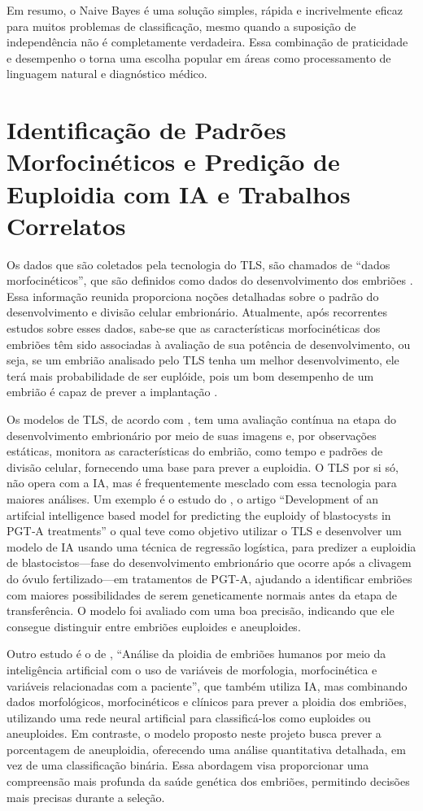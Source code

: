 Em resumo, o Naive Bayes é uma solução simples, rápida e incrivelmente eficaz para muitos problemas de classificação, mesmo quando a suposição de independência não é completamente verdadeira. Essa combinação de praticidade e desempenho o torna uma escolha popular em áreas como processamento de linguagem natural e diagnóstico médico.

\section{Identificação de Padrões Morfocinéticos e Predição de Euploidia com IA e Trabalhos Correlatos}

Os dados que são coletados pela tecnologia do TLS, são chamados de “dados morfocinéticos”, que são definidos como dados do desenvolvimento dos embriões \cite{moustakli2024}. Essa informação reunida proporciona noções detalhadas sobre o padrão do desenvolvimento e divisão celular embrionário. Atualmente, após recorrentes estudos sobre esses dados, sabe-se que as características morfocinéticas dos embriões têm sido associadas à avaliação de sua potência de desenvolvimento, ou seja, se um embrião analisado pelo TLS tenha um melhor desenvolvimento, ele terá mais probabilidade de ser euplóide, pois um bom desempenho de um embrião é capaz de prever a implantação \cite{yuan2023}. 

Os modelos de TLS, de acordo com , tem uma avaliação contínua na etapa do desenvolvimento embrionário por meio de suas imagens e, por observações estáticas, monitora as características do embrião, como tempo e padrões de divisão celular, fornecendo uma base para prever a euploidia. O TLS por si só, não opera com a IA, mas é frequentemente mesclado com essa tecnologia para maiores análises. Um exemplo é o estudo do , o artigo “Development of an artifcial intelligence based model for predicting the euploidy of blastocysts in PGT‐A treatments” o qual teve como objetivo utilizar o TLS e desenvolver um modelo de IA usando uma técnica de regressão logística, para predizer a euploidia de blastocistos—fase do desenvolvimento embrionário que ocorre após a clivagem do óvulo fertilizado—em tratamentos de PGT-A, ajudando a identificar embriões com maiores possibilidades de serem geneticamente normais antes da etapa de transferência. O modelo foi avaliado com uma boa precisão, indicando que ele consegue distinguir entre embriões euploides e aneuploides.

Outro estudo é o de , “Análise da ploidia de embriões humanos por meio da inteligência artificial com o uso de variáveis de morfologia, morfocinética e variáveis relacionadas com a paciente”, que também utiliza IA, mas combinando dados morfológicos, morfocinéticos e clínicos para prever a ploidia dos embriões, utilizando uma rede neural artificial para classificá-los como euploides ou aneuploides. Em contraste, o modelo proposto neste projeto busca prever a porcentagem de aneuploidia, oferecendo uma análise quantitativa detalhada, em vez de uma classificação binária. Essa abordagem visa proporcionar uma compreensão mais profunda da saúde genética dos embriões, permitindo decisões mais precisas durante a seleção. 

